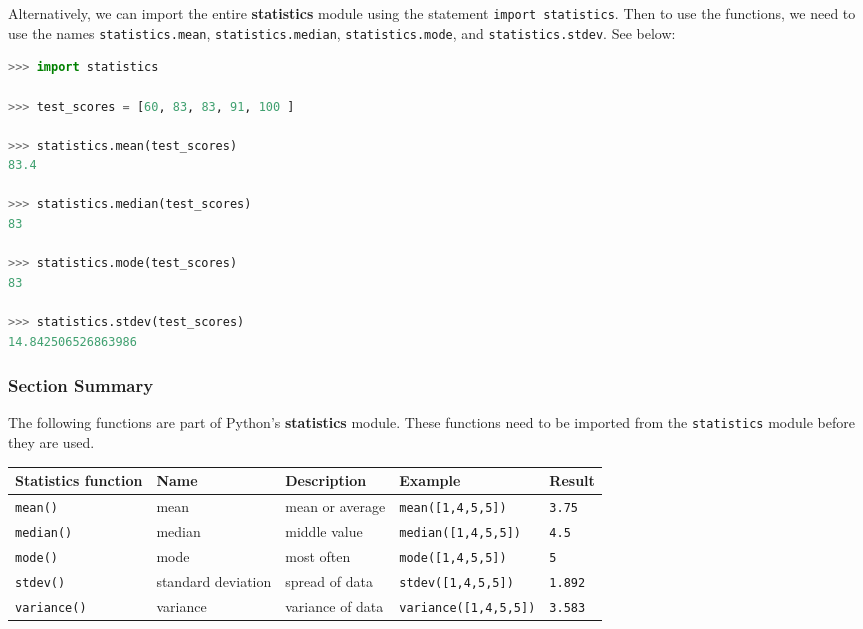 \documentclass{book}
\newcommand{\passthrough}[1]{#1}
\begin{document}
Alternatively, we can import the entire \textbf{statistics} module using
the statement \passthrough{\lstinline!import statistics!}. Then to use
the functions, we need to use the names
\passthrough{\lstinline!statistics.mean!},
\passthrough{\lstinline!statistics.median!},
\passthrough{\lstinline!statistics.mode!}, and
\passthrough{\lstinline!statistics.stdev!}. See below:

\begin{lstlisting}[language=Python]
>>> import statistics
    
>>> test_scores = [60, 83, 83, 91, 100 ]
    
>>> statistics.mean(test_scores)
83.4

>>> statistics.median(test_scores)
83

>>> statistics.mode(test_scores)
83
    
>>> statistics.stdev(test_scores)
14.842506526863986 
\end{lstlisting}
    




    
        \hypertarget{section-summary}{%
\subsubsection{Section Summary}\label{section-summary}}

The following functions are part of Python's \textbf{statistics} module.
These functions need to be imported from the
\passthrough{\lstinline!statistics!} module before they are used.

\begin{longtable}[]{@{}lllll@{}}
\toprule
Statistics function & Name & Description & Example &
Result\tabularnewline
\midrule
\endhead
\passthrough{\lstinline!mean()!} & mean & mean or average &
\passthrough{\lstinline!mean([1,4,5,5])!} &
\passthrough{\lstinline!3.75!}\tabularnewline
\passthrough{\lstinline!median()!} & median & middle value &
\passthrough{\lstinline!median([1,4,5,5])!} &
\passthrough{\lstinline!4.5!}\tabularnewline
\passthrough{\lstinline!mode()!} & mode & most often &
\passthrough{\lstinline!mode([1,4,5,5])!} &
\passthrough{\lstinline!5!}\tabularnewline
\passthrough{\lstinline!stdev()!} & standard deviation & spread of data
& \passthrough{\lstinline!stdev([1,4,5,5])!} &
\passthrough{\lstinline!1.892!}\tabularnewline
\passthrough{\lstinline!variance()!} & variance & variance of data &
\passthrough{\lstinline!variance([1,4,5,5])!} &
\passthrough{\lstinline!3.583!}\tabularnewline
\bottomrule
\end{longtable}
    
\end{document}
